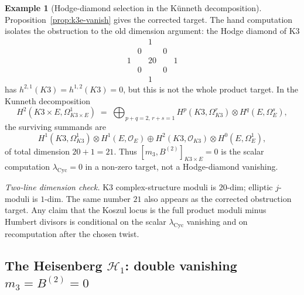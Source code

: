 \documentclass[11pt,reqno]{amsart}
\theoremstyle{plain}
\theoremstyle{definition}
\newtheorem{example}[theorem]{Example}
\theoremstyle{remark}
\newcommand{\cH}{\mathcal{H}}
\newcommand{\cO}{\mathcal{O}}
\begin{document}
\begin{example}[Hodge-diamond selection in the K\"unneth decomposition]
\label{ex:hand-k3e}
Proposition~\ref{prop:k3e-vanish} gives the corrected target. The hand computation isolates the obstruction to the old dimension argument: the Hodge diamond of K3
\[
  \begin{array}{ccccc}
    & & 1 & & \\
    & 0 & & 0 & \\
    1 & & 20 & & 1 \\
    & 0 & & 0 & \\
    & & 1 & &
  \end{array}
\]
has $h^{2,1}(K3) = h^{1,2}(K3) = 0$, but this is not the whole product target. In the Kunneth decomposition
\[
  H^2(K3 \times E, \Omega^1_{K3 \times E}) \;=\; \bigoplus_{p + q = 2,\, r + s = 1} H^p(K3, \Omega^r_{K3}) \otimes H^q(E, \Omega^s_E),
\]
the surviving summands are
\[
H^1(K3,\Omega^1_{K3})\otimes H^1(E,\cO_E)
\oplus
H^2(K3,\cO_{K3})\otimes H^0(E,\Omega^1_E),
\]
of total dimension $20+1=21$. Thus $[m_3,B^{(2)}]_{K3\times E}=0$ is
the scalar computation $\lambda_{\mathrm{Cyc}}=0$ in a non-zero target,
not a Hodge-diamond vanishing.

\emph{Two-line dimension check.} K3 complex-structure moduli is $20$-dim; elliptic $j$-moduli is $1$-dim. The same number $21$ also appears as the corrected obstruction target. Any claim that the Koszul locus is the full product moduli minus Humbert divisors is conditional on the scalar $\lambda_{\mathrm{Cyc}}$ vanishing and on recomputation after the chosen twist.
\end{example}

\subsection{The Heisenberg $\cH_1$: double vanishing $m_3 = B^{(2)} = 0$}
\label{sub:hand-heisenberg}
\end{document}
